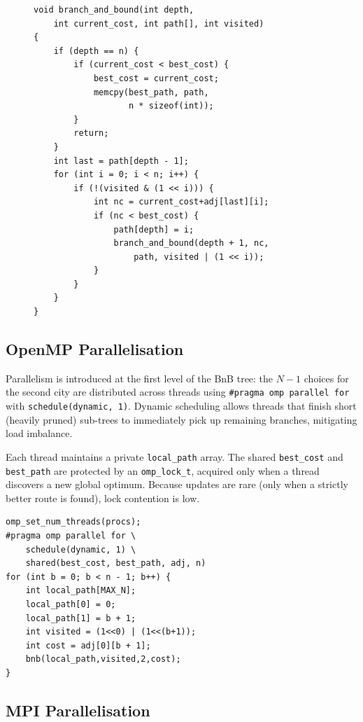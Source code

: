 \documentclass[conference]{IEEEtran}
\begin{document}
\begin{figure}[h]
\begin{lstlisting}[caption={Core BnB recursive function (MPI version)},label={lst:bnb}]
void branch_and_bound(int depth,
    int current_cost, int path[], int visited)
{
    if (depth == n) {
        if (current_cost < best_cost) {
            best_cost = current_cost;
            memcpy(best_path, path,
                   n * sizeof(int));
        }
        return;
    }
    int last = path[depth - 1];
    for (int i = 0; i < n; i++) {
        if (!(visited & (1 << i))) {
            int nc = current_cost+adj[last][i];
            if (nc < best_cost) {
                path[depth] = i;
                branch_and_bound(depth + 1, nc,
                    path, visited | (1 << i));
            }
        }
    }
}
\end{lstlisting}
\end{figure}

\subsection{OpenMP Parallelisation}

Parallelism is introduced at the first level of the BnB tree: the $N{-}1$
choices for the second city are distributed across threads using
\texttt{\#pragma omp parallel for} with \texttt{schedule(dynamic,\,1)}.
Dynamic scheduling allows threads that finish short (heavily pruned) sub-trees
to immediately pick up remaining branches, mitigating load imbalance.

Each thread maintains a private \texttt{local\_path} array. The shared
\texttt{best\_cost} and \texttt{best\_path} are protected by an
\texttt{omp\_lock\_t}, acquired only when a thread discovers a new global
optimum. Because updates are rare (only when a strictly better route is found),
lock contention is low.

\begin{lstlisting}[caption={OpenMP work distribution},label={lst:omp}]
omp_set_num_threads(procs);
#pragma omp parallel for \
    schedule(dynamic, 1) \
    shared(best_cost, best_path, adj, n)
for (int b = 0; b < n - 1; b++) {
    int local_path[MAX_N];
    local_path[0] = 0;
    local_path[1] = b + 1;
    int visited = (1<<0) | (1<<(b+1));
    int cost = adj[0][b + 1];
    bnb(local_path,visited,2,cost);
}
\end{lstlisting}

\subsection{MPI Parallelisation}
\end{document}
